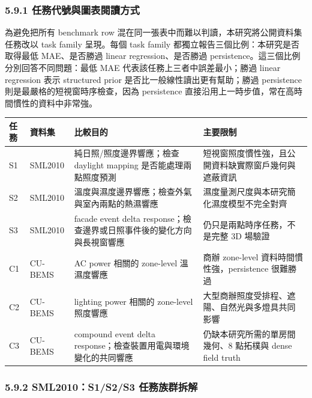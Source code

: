 \documentclass[12pt,a4paper]{article}
\begin{document}
\subsubsection*{5.9.1 任務代號與圖表閱讀方式}

為避免把所有 benchmark row 混在同一張表中而難以判讀，本研究將公開資料集任務改以 task family 呈現。每個 task family 都獨立報告三個比例：本研究是否取得最低 MAE、是否勝過 linear regression、是否勝過 persistence。這三個比例分別回答不同問題：最低 MAE 代表該任務上三者中誤差最小；勝過 linear regression 表示 structured prior 是否比一般線性讀出更有幫助；勝過 persistence 則是最嚴格的短視窗時序檢查，因為 persistence 直接沿用上一時步值，常在高時間慣性的資料中非常強。


\begin{table}[htbp]
\centering
\footnotesize
\renewcommand{\arraystretch}{1.25}
\begin{tabular}{|>{\raggedright\arraybackslash}p{}|>{\raggedright\arraybackslash}p{}|>{\raggedright\arraybackslash}p{}|>{\raggedright\arraybackslash}p{}|}
\hline
\textbf{任務} & \textbf{資料集} & \textbf{比較目的} & \textbf{主要限制} \\
\hline
S1 & SML2010 & 純日照/照度邊界響應；檢查 daylight mapping 是否能處理兩點照度預測 & 短視窗照度慣性強，且公開資料缺實際窗戶幾何與遮蔽資訊 \\
\hline
S2 & SML2010 & 溫度與濕度邊界響應；檢查外氣與室內兩點的熱濕響應 & 濕度量測尺度與本研究簡化濕度模型不完全對齊 \\
\hline
S3 & SML2010 & facade event delta response；檢查邊界或日照事件後的變化方向與長視窗響應 & 仍只是兩點時序任務，不是完整 3D 場驗證 \\
\hline
C1 & CU-BEMS & AC power 相關的 zone-level 溫濕度響應 & 商辦 zone-level 資料時間慣性強，persistence 很難勝過 \\
\hline
C2 & CU-BEMS & lighting power 相關的 zone-level 照度響應 & 大型商辦照度受排程、遮陽、自然光與多燈具共同影響 \\
\hline
C3 & CU-BEMS & compound event delta response；檢查裝置用電與環境變化的共同響應 & 仍缺本研究所需的單房間幾何、8 點拓樸與 dense field truth \\
\hline
\end{tabular}
\end{table}

\subsubsection*{5.9.2 SML2010：S1/S2/S3 任務族群拆解}
\end{document}
